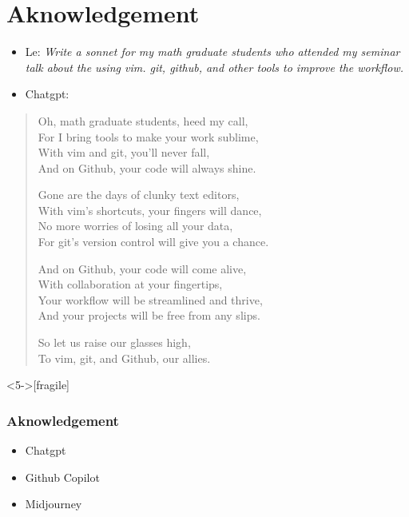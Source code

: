 \documentclass[9pt,table,xcolor=dvipsnames]{beamer}%
\theoremstyle{definition}
\theoremstyle{plain}
\begin{document}
\section{Aknowledgement}
\begin{frame}[fragile,t] %
  \begin{itemize}
    \item Le: {\small \it Write a sonnet for my math graduate students who
      attended my seminar talk about the using vim. git, github, and other
    tools to improve the workflow.}
    \vfill
    \item Chatgpt:
  \end{itemize}
   \begin{quotation}
      Oh, math graduate students, heed my call, \\
      For I bring tools to make your work sublime, \\
      With vim and git, you'll never fall, \\
      And on Github, your code will always shine.       \\ \bigskip

      Gone are the days of clunky text editors,         \\
      With vim's shortcuts, your fingers will dance,    \\
      No more worries of losing all your data,          \\
      For git's version control will give you a chance. \\ \bigskip

      And on Github, your code will come alive,         \\
      With collaboration at your fingertips,            \\
      Your workflow will be streamlined and thrive,     \\
      And your projects will be free from any slips.    \\ \bigskip

      So let us raise our glasses high,                 \\
      To vim, git, and Github, our allies.              \\
   \end{quotation}
\end{frame}
\begin{frame}<5->[fragile] %
  \frametitle{Aknowledgement}

  \begin{center}
    \begin{minipage}{0.4 \textwidth}
      \Large
      \begin{itemize}
        \item Chatgpt
        \item Github Copilot
        \item Midjourney
      \end{itemize}
    \end{minipage}
  \end{center}


\end{frame}
\end{document}
